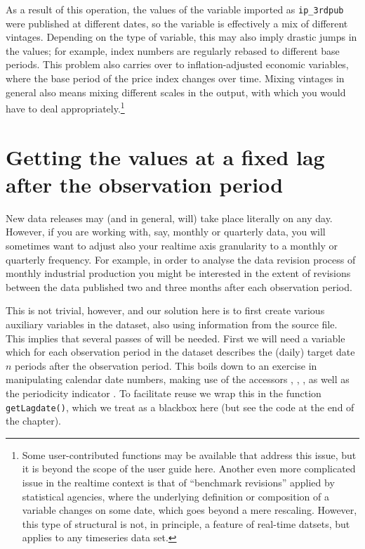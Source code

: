 As a result of this operation, the values of the variable imported as
\texttt{ip\_3rdpub} were published at different dates, so the variable
is effectively a mix of different vintages. Depending on the type of
variable, this may also imply drastic jumps in the values; for
example, index numbers are regularly rebased to different base
periods. This problem also carries over to inflation-adjusted economic
variables, where the base period of the price index changes over
time. Mixing vintages in general also means mixing different scales in
the output, with which you would have to deal
appropriately.\footnote{Some user-contributed functions may be
  available that address this issue, but it is beyond the scope of the
  user guide here. Another even more complicated issue in the realtime
  context is that of ``benchmark revisions'' applied by statistical
  agencies, where the underlying definition or composition of a
  variable changes on some date, which goes beyond a mere
  rescaling. However, this type of structural is not, in principle, a
  feature of real-time datsets, but applies to any timeseries data
  set.}


\section{Getting the values at a fixed lag after the observation
  period}

New data releases may (and in general, will) take place literally on
any day. However, if you are working with, say, monthly or quarterly
data, you will sometimes want to adjust also your realtime axis
granularity to a monthly or quarterly frequency. For example, in order
to analyse the data revision process of monthly industrial production
you might be interested in the extent of revisions between the data
published two and three months after each observation period.

This is not trivial, however, and our solution here is to first create
various auxiliary variables in the  dataset, also using
information from the source file. This implies that several passes of
 will be needed. First we will need a variable which for
each observation period in the dataset describes the (daily) target
date $n$ periods after the observation period. This boils down to an
exercise in manipulating calendar date numbers, making use of the
 accessors , ,
, as well as the periodicity indicator .
To facilitate reuse we wrap this in the function
\texttt{getLagdate()}, which we treat as a blackbox here (but see the
code at the end of the chapter).

